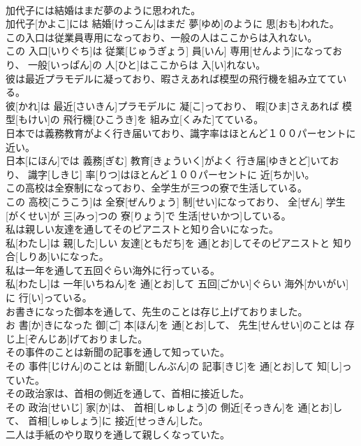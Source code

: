 \documentclass[8pt]{extreport}
\begin{document}
\begin{CJK}{UTF8}{min}
\\	加代子には結婚はまだ夢のように思われた。	
\\	加代子[かよこ]には 結婚[けっこん]はまだ 夢[ゆめ]のように 思[おも]われた。
\\	この入口は従業員専用になっており、一般の人はここからは入れない。	
\\	この 入口[いりぐち]は 従業[じゅうぎょう] 員[いん] 専用[せんよう]になっており、 一般[いっぱん]の 人[ひと]はここからは 入[い]れない。
\\	彼は最近プラモデルに凝っており、暇さえあれば模型の飛行機を組み立てている。	
\\	彼[かれ]は 最近[さいきん]プラモデルに 凝[こ]っており、 暇[ひま]さえあれば 模型[もけい]の 飛行機[ひこうき]を 組み立[くみた]てている。
\\	日本では義務教育がよく行き届いており、識字率はほとんど１００パーセントに近い。	
\\	日本[にほん]では 義務[ぎむ] 教育[きょういく]がよく 行き届[ゆきとど]いており、 識字[しきじ] 率[りつ]はほとんど１００パーセントに 近[ちか]い。
\\	この高校は全寮制になっており、全学生が三つの寮で生活している。	
\\	この 高校[こうこう]は 全寮[ぜんりょう] 制[せい]になっており、 全[ぜん] 学生[がくせい]が 三[みっ]つの 寮[りょう]で 生活[せいかつ]している。
\\	私は親しい友達を通してそのピアニストと知り合いになった。	
\\	私[わたし]は 親[した]しい 友達[ともだち]を 通[とお]してそのピアニストと 知り合[しりあ]いになった。
\\	私は一年を通して五回ぐらい海外に行っている。	
\\	私[わたし]は 一年[いちねん]を 通[とお]して 五回[ごかい]ぐらい 海外[かいがい]に 行[い]っている。
\\	お書きになった御本を通して、先生のことは存じ上げておりました。	
\\	お 書[か]きになった 御[ご] 本[ほん]を 通[とお]して、 先生[せんせい]のことは 存じ上[ぞんじあ]げておりました。
\\	その事件のことは新聞の記事を通して知っていた。	
\\	その 事件[じけん]のことは 新聞[しんぶん]の 記事[きじ]を 通[とお]して 知[し]っていた。
\\	その政治家は、首相の側近を通して、首相に接近した。	
\\	その 政治[せいじ] 家[か]は、 首相[しゅしょう]の 側近[そっきん]を 通[とお]して、 首相[しゅしょう]に 接近[せっきん]した。
\\	二人は手紙のやり取りを通して親しくなっていた。	

\end{CJK}
\end{document}
